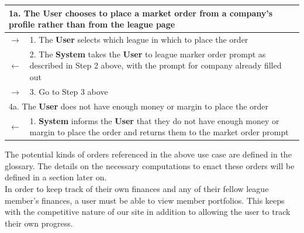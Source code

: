 \begin{centering}
\begin{longtable}{|p{1.2in} p{5in}|}
\multicolumn{2}{|p{6.2in}|}{1a. The \textbf{User} chooses to place a market order from a company's profile rather than from the league page} \\
\hline
$\rightarrow$ & 1. The \textbf{User} selects which league in which to place the order  \\
$\leftarrow$ & 2. The \textbf{System} takes the \textbf{User} to league marker order prompt as described in Step 2 above, with the prompt for company already filled out \\
$\rightarrow$ & 3. Go to Step 3 above \\
\hline
\multicolumn{2}{|p{6.2in}|}{4a. The \textbf{User} does not have enough money or margin to place the order} \\
\hline
$\leftarrow$ & 1. \textbf{System} informs the \textbf{User} that they do not have enough money or margin to place the order and returns them to the market order prompt \\
\hline 
\end{longtable}
\end{centering}

The potential kinds of orders referenced in the above use case are defined in the glossary. The details on the necessary computations to enact these orders will be defined in a section later on. \\

In order to keep track of their own finances and any of their fellow league member's finances, a user must be able to view member portfolios. This keeps with the competitive nature of our site in addition to allowing the user to track their own progress. \\

